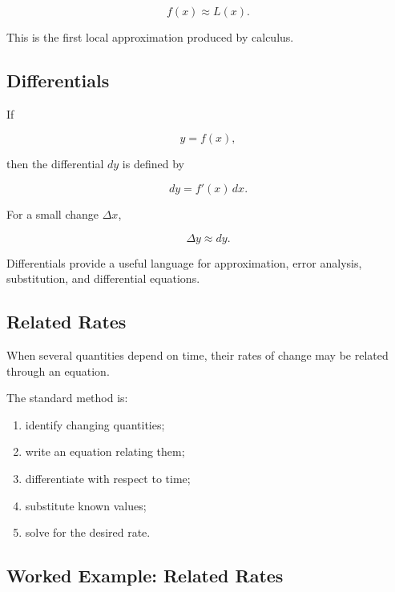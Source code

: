 \[ f(x)\approx L(x). \]

This is the first local approximation produced by calculus.

\subsection{Differentials}
\label{subsec:differentials}

If

\[ y=f(x), \]

then the differential \(dy\) is defined by

\[ dy=f'(x)\,dx. \]

For a small change \(\Delta x\),

\[ \Delta y\approx dy. \]

Differentials provide a useful language for approximation, error analysis,
substitution, and differential equations.

\subsection{Related Rates}
\label{subsec:related-rates}

When several quantities depend on time, their rates of change may be related
through an equation.

The standard method is:

\begin{enumerate}
    \item identify changing quantities;
    \item write an equation relating them;
    \item differentiate with respect to time;
    \item substitute known values;
    \item solve for the desired rate.
\end{enumerate}

\subsection{Worked Example: Related Rates}
\label{subsec:worked-related-rates}

